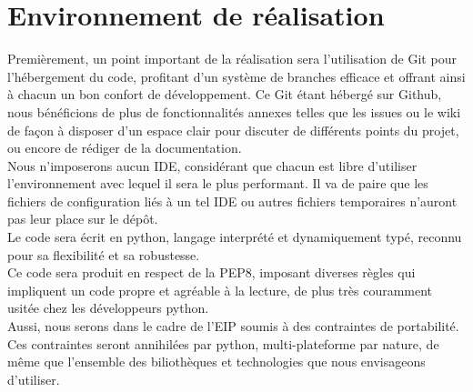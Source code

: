 \section{Environnement de réalisation}
Premièrement, un point important de la réalisation sera l'utilisation de Git pour l'hébergement du code, profitant d'un système de branches efficace et offrant ainsi à chacun un bon confort de développement. Ce Git étant hébergé sur Github, nous bénéficions de plus de fonctionnalités annexes telles que les issues ou le wiki de façon à disposer d'un espace clair pour discuter de différents points du projet, ou encore de rédiger de la documentation.\\

Nous n'imposerons aucun IDE, considérant que chacun est libre d'utiliser l'environnement avec lequel il sera le plus performant. Il va de paire que les fichiers de configuration liés à un tel IDE ou autres fichiers temporaires n'auront pas leur place sur le dépôt.\\

Le code sera écrit en python, langage interprété et dynamiquement typé, reconnu pour sa flexibilité et sa robustesse.\\
Ce code sera produit en respect de la PEP8, imposant diverses règles qui impliquent un code propre et agréable à la lecture, de plus très couramment usitée chez les développeurs python.\\

Aussi, nous serons dans le cadre de l'EIP soumis à des contraintes de portabilité. Ces contraintes seront annihilées par python, multi-plateforme par nature, de même que l'ensemble des biliothèques et technologies que nous envisageons d'utiliser.
